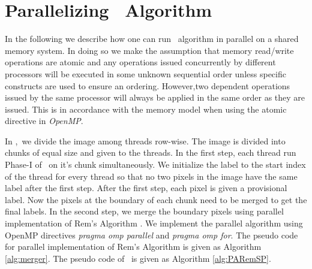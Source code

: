 \section{Parallelizing \aremsp\ Algorithm}
\label{sec:parallel_algo}
In the following we describe how one can run \aremsp\ algorithm in parallel
on a shared memory system. In doing so we make the assumption that memory read/write 
operations are atomic and any operations issued concurrently by different processors will be executed in some unknown 
sequential order unless specific constructs are used to ensure an ordering.
However,two dependent operations issued by 
the same processor will always be applied in the same order as they are issued. 
This is in accordance with the memory model when using the atomic directive in
{\em OpenMP}.

In \paremsp,\ we divide the image among threads row-wise. The image is
divided into chunks of equal size and given to the threads. In the first step,
each thread run Phase-I of \aremsp\ on it's chunk simultaneously. We
initialize the label to the start index of the thread for every thread so that no 
two pixels in the image have the same label after the first step. After the first step, 
each pixel is given a provisional label. Now the pixels at the boundary of each chunk need to 
be merged to get the final labels. In the second step, we merge the boundary pixels using parallel 
implementation of Rem's Algorithm \cite{Patwary2012_PARemSP}. We implement the parallel algorithm using
OpenMP directives {\em pragma omp parallel} and {\em pragma omp for}. The
pseudo code for parallel implementation of Rem's Algorithm is given as Algorithm
\ref{alg:merger}. The pseudo code of \paremsp\ is given as Algorithm
\ref{alg:PARemSP}.
